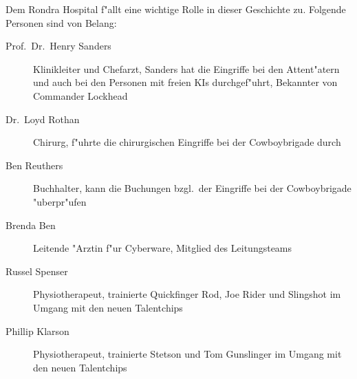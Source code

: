 
Dem Rondra Hospital f"allt eine wichtige Rolle in dieser Geschichte zu. Folgende Personen sind von Belang:

\begin{description}
    \item[Prof.~Dr.~Henry Sanders] Klinikleiter und Chefarzt, Sanders hat die Eingriffe bei den Attent"atern und auch 
        bei den Personen mit freien KIs durchgef"uhrt, Bekannter von Commander Lockhead
    \item[Dr.~Loyd Rothan] Chirurg, f"uhrte die chirurgischen Eingriffe bei der Cowboybrigade durch
    \item[Ben Reuthers] Buchhalter, kann die Buchungen bzgl.~der Eingriffe bei der Cowboybrigade "uberpr"ufen
    \item[Brenda Ben] Leitende "Arztin f"ur Cyberware, Mitglied des Leitungsteams
    \item[Russel Spenser] Physiotherapeut, trainierte Quickfinger Rod, Joe Rider und Slingshot im Umgang mit den neuen 
        Talentchips
    \item[Phillip Klarson] Physiotherapeut, trainierte Stetson und Tom Gunslinger im Umgang mit den neuen Talentchips
\end{description}
